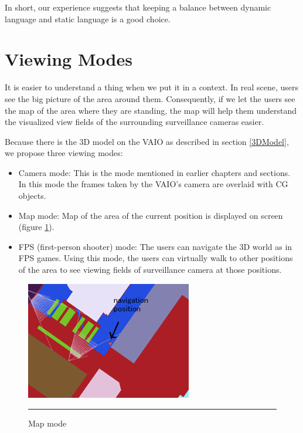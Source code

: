 In short, our experience suggests that keeping a balance between dynamic language and static language is a good choice.


\section{Viewing Modes}

It is easier to understand a thing when we put it in a context. In real scene, users see the big picture of the area around them. Consequently, if we let the users see the map of the area where they are standing, the map will help them understand the visualized view fields of the surrounding surveillance cameras easier.

Because there is the 3D model on the VAIO as described in section \ref{3DModel}, we propose three viewing modes:

\begin{itemize}
	\item Camera mode: This is the mode mentioned in earlier chapters and sections. In this mode the frames taken by the VAIO's camera are overlaid with CG objects.
	\item Map mode: Map of the area of the current position is displayed on screen (figure \ref{fig:MapMode}).
	\item FPS (first-person shooter) mode: The users can navigate the 3D world as in FPS games. Using this mode, the users can virtually walk to other positions of the area to see viewing fields of surveillance camera at those positions.
\end{itemize}

\begin{figure}[htbp]
	\centering
	\includegraphics{./Primitives/map_mode.png}
	\rule{35em}{0.5pt}
	\caption[Map mode]{Map mode}
	\label{fig:MapMode}
\end{figure}


